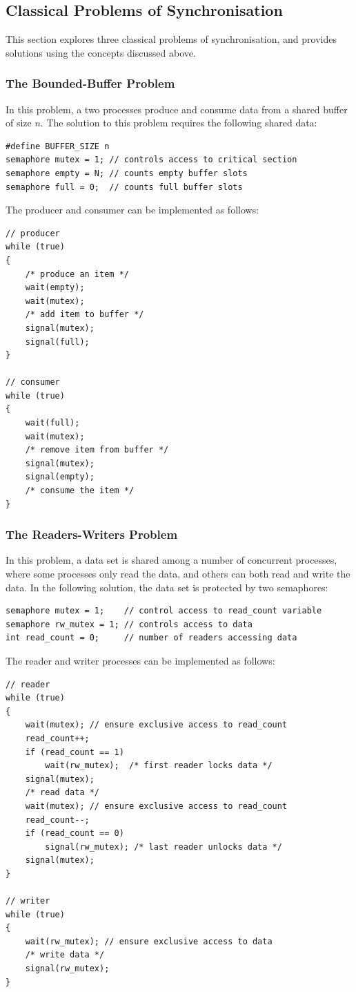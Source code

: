\documentclass{article}
\begin{document}
\subsection{Classical Problems of Synchronisation}
This section explores three classical problems of synchronisation, and
provides solutions using the concepts discussed above.
\subsubsection{The Bounded-Buffer Problem}
In this problem, a two processes produce and consume data from a shared
buffer of size \(n\). The solution to this problem requires the
following shared data:
\begin{verbatim}
#define BUFFER_SIZE n
semaphore mutex = 1; // controls access to critical section
semaphore empty = N; // counts empty buffer slots
semaphore full = 0;  // counts full buffer slots
\end{verbatim}
The producer and consumer can be implemented as follows:
\begin{verbatim}
// producer
while (true)
{
    /* produce an item */
    wait(empty);
    wait(mutex);
    /* add item to buffer */
    signal(mutex);
    signal(full);
}

// consumer
while (true)
{
    wait(full);
    wait(mutex);
    /* remove item from buffer */
    signal(mutex);
    signal(empty);
    /* consume the item */
}
\end{verbatim}
\subsubsection{The Readers-Writers Problem}
In this problem, a data set is shared among a number of concurrent
processes, where some processes only read the data, and others can both
read and write the data. In the following solution, the data set is
protected by two semaphores:
\begin{verbatim}
semaphore mutex = 1;    // control access to read_count variable
semaphore rw_mutex = 1; // controls access to data
int read_count = 0;     // number of readers accessing data
\end{verbatim}
The reader and writer processes can be implemented as follows:
\begin{verbatim}
// reader
while (true)
{
    wait(mutex); // ensure exclusive access to read_count
    read_count++;
    if (read_count == 1)
        wait(rw_mutex);  /* first reader locks data */
    signal(mutex);
    /* read data */
    wait(mutex); // ensure exclusive access to read_count
    read_count--;
    if (read_count == 0)
        signal(rw_mutex); /* last reader unlocks data */
    signal(mutex);
}

// writer
while (true)
{
    wait(rw_mutex); // ensure exclusive access to data
    /* write data */
    signal(rw_mutex);
}
\end{verbatim}
\end{document}
